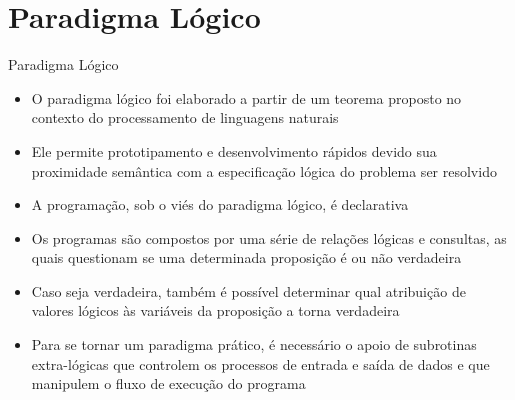 \section{Paradigma Lógico}


\begin{frame}[fragile]{Paradigma Lógico}

    \begin{itemize}
        \item O paradigma lógico foi elaborado a partir de um teorema proposto no contexto
            do processamento de linguagens naturais

        \item Ele permite prototipamento e desenvolvimento rápidos devido sua proximidade
            semântica com a especificação lógica do problema ser resolvido

        \item A programação, sob o viés do paradigma lógico, é declarativa

        \item Os programas são compostos por uma série de relações lógicas e consultas, as
            quais questionam se uma determinada proposição é ou não verdadeira

        \item Caso seja verdadeira, também é possível determinar qual atribuição de valores
            lógicos às variáveis da proposição a torna verdadeira

        \item Para se tornar um paradigma prático, é necessário o apoio de subrotinas
            extra-lógicas que controlem os processos de entrada e saída de dados e que 
            manipulem o fluxo de execução do programa
    \end{itemize}

\end{frame}

